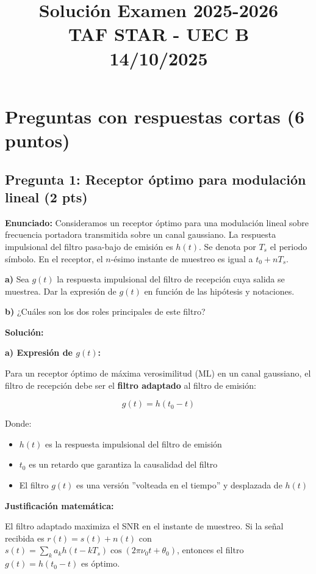 \documentclass[11pt,a4paper]{article}
\title{\textbf{Soluci\'on Examen 2025-2026\\TAF STAR - UEC B\\14/10/2025}}
\author{}
\date{}
\begin{document}
\maketitle

\section*{Preguntas con respuestas cortas (6 puntos)}

\subsection*{Pregunta 1: Receptor \'optimo para modulaci\'on lineal (2 pts)}

\textbf{Enunciado:} Consideramos un receptor \'optimo para una modulaci\'on lineal sobre frecuencia portadora transmitida sobre un canal gaussiano. La respuesta impulsional del filtro pasa-bajo de emisi\'on es $h(t)$. Se denota por $T_s$ el periodo s\'imbolo. En el receptor, el $n$-\'esimo instante de muestreo es igual a $t_0 + nT_s$.

\textbf{a)} Sea $g(t)$ la respuesta impulsional del filtro de recepci\'on cuya salida se muestrea. Dar la expresi\'on de $g(t)$ en funci\'on de las hip\'otesis y notaciones.

\textbf{b)} ¿Cu\'ales son los dos roles principales de este filtro?

\vspace{0.3cm}
\textbf{Soluci\'on:}

\textbf{a) Expresi\'on de $g(t)$:}

Para un receptor \'optimo de m\'axima verosimilitud (ML) en un canal gaussiano, el filtro de recepci\'on debe ser el \textbf{filtro adaptado} al filtro de emisi\'on:

\[
\boxed{g(t) = h(t_0 - t)}
\]

Donde:
\begin{itemize}
    \item $h(t)$ es la respuesta impulsional del filtro de emisi\'on
    \item $t_0$ es un retardo que garantiza la causalidad del filtro
    \item El filtro $g(t)$ es una versi\'on ''volteada en el tiempo'' y desplazada de $h(t)$
\end{itemize}

\textbf{Justificaci\'on matem\'atica:}

El filtro adaptado maximiza el SNR en el instante de muestreo. Si la se\~nal recibida es $r(t) = s(t) + n(t)$ con $s(t) = \sum_k a_k h(t-kT_s)\cos(2\pi\nu_0 t + \theta_0)$, entonces el filtro $g(t) = h(t_0 - t)$ es \'optimo.
\end{document}
